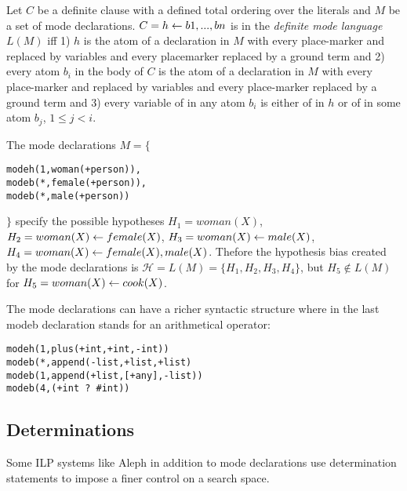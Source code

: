 \begin{defn}\label{definition_definite_mode_language}\cite{muggleton1995inverse}
Let $C$ be a definite clause with a
defined total ordering over the literals and $M$ be a set of mode declarations.
$C = h \leftarrow b1, ..., bn$ is in the \emph{definite mode language} $L(M)$ iff 1) $h$ is the atom
of a  declaration in $M$ with every place-marker  and  replaced by
variables and every placemarker  replaced by a ground term and 2) every
atom $b_i$ in the body of $C$ is the atom of a  declaration in $M$ with every
place-marker  and  replaced by variables and every place-marker 
replaced by a ground term and 3) every variable of  in any atom $b_i$ is either
of  in $h$ or of  in some atom $b_j$, $1 \le j < i$.
\end{defn}

\begin{exmp}
The mode declarations $M=\{$
\begin{lstlisting}
modeh(1,woman(+person)),
modeb(*,female(+person)),
modeb(*,male(+person))
\end{lstlisting}
$\}$
specify the possible hypotheses
$H_1=woman(X)$,
$H_2=woman(X) \leftarrow female(X)$,
$H_3=woman(X) \leftarrow male(X)$,
$H_4=woman(X) \leftarrow female(X), male(X)$.
Thefore the hypothesis bias created by the mode declarations 
is $\mathcal{H}=L(M)=\{H_1, H_2, H_3, H_4\}$, but $H_5 \not\in L(M)$ for
$H_5=woman(X) \leftarrow cook(X)$.
\end{exmp}

The mode declarations can have a richer syntactic structure where  in the last modeb declaration stands for an arithmetical operator:
\begin{exmp}\cite{muggleton1995inverse}
\begin{lstlisting}
modeh(1,plus(+int,+int,-int))
modeb(*,append(-list,+list,+list)
modeb(1,append(+list,[+any],-list))
modeb(4,(+int ? #int))
\end{lstlisting}
\end{exmp}

\subsection{Determinations}\label{bias_determinations}
Some ILP systems like Aleph in addition to mode declarations use determination statements\cite{aleph2007} to impose a finer control on a search space.

